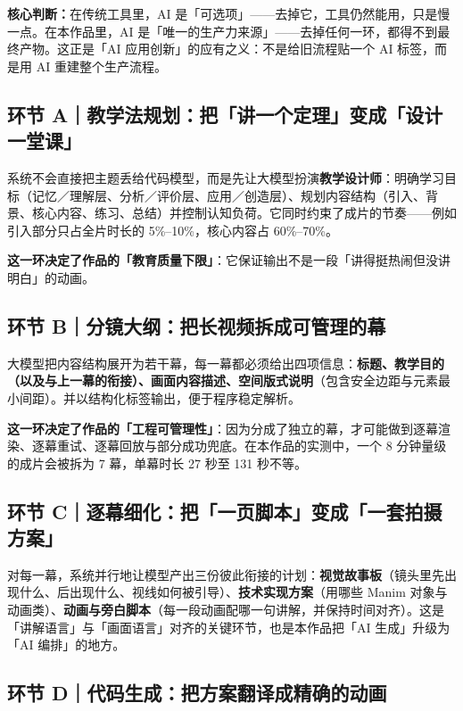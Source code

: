 \documentclass[11pt,a4paper]{ctexart}
\begin{document}
\begin{keybox}
\textbf{核心判断：}在传统工具里，AI 是「可选项」——去掉它，工具仍然能用，只是慢一点。在本作品里，AI 是「唯一的生产力来源」——去掉任何一环，都得不到最终产物。这正是「AI 应用创新」的应有之义：不是给旧流程贴一个 AI 标签，而是用 AI 重建整个生产流程。
\end{keybox}

\subsection{环节 A｜教学法规划：把「讲一个定理」变成「设计一堂课」}

系统不会直接把主题丢给代码模型，而是先让大模型扮演\textbf{教学设计师}：明确学习目标（记忆／理解层、分析／评价层、应用／创造层）、规划内容结构（引入、背景、核心内容、练习、总结）并控制认知负荷。它同时约束了成片的节奏——例如引入部分只占全片时长的 5\%--10\%，核心内容占 60\%--70\%。

\textbf{这一环决定了作品的「教育质量下限」}：它保证输出不是一段「讲得挺热闹但没讲明白」的动画。

\subsection{环节 B｜分镜大纲：把长视频拆成可管理的幕}

大模型把内容结构展开为若干幕，每一幕都必须给出四项信息：\textbf{标题、教学目的（以及与上一幕的衔接）、画面内容描述、空间版式说明}（包含安全边距与元素最小间距）。并以结构化标签输出，便于程序稳定解析。

\textbf{这一环决定了作品的「工程可管理性」}：因为分成了独立的幕，才可能做到逐幕渲染、逐幕重试、逐幕回放与部分成功兜底。在本作品的实测中，一个 8 分钟量级的成片会被拆为 7 幕，单幕时长 27 秒至 131 秒不等。

\subsection{环节 C｜逐幕细化：把「一页脚本」变成「一套拍摄方案」}

对每一幕，系统并行地让模型产出三份彼此衔接的计划：\textbf{视觉故事板}（镜头里先出现什么、后出现什么、视线如何被引导）、\textbf{技术实现方案}（用哪些 Manim 对象与动画类）、\textbf{动画与旁白脚本}（每一段动画配哪一句讲解，并保持时间对齐）。这是「讲解语言」与「画面语言」对齐的关键环节，也是本作品把「AI 生成」升级为「AI 编排」的地方。

\subsection{环节 D｜代码生成：把方案翻译成精确的动画}
\end{document}
